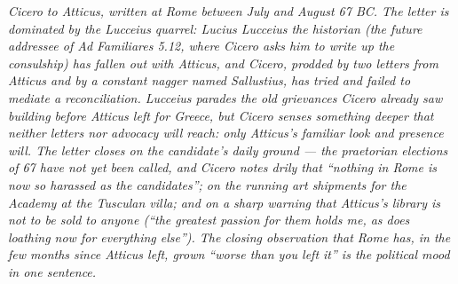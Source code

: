 
\textit{Cicero to Atticus, written at Rome between July and
August 67 BC. The letter is dominated by the Lucceius
quarrel: Lucius Lucceius the historian (the future
addressee of \textit{Ad Familiares} 5.12, where Cicero asks
him to write up the consulship) has fallen out with
Atticus, and Cicero, prodded by two letters from Atticus
and by a constant nagger named Sallustius, has tried and
failed to mediate a reconciliation. Lucceius parades the
old grievances Cicero already saw building before Atticus
left for Greece, but Cicero senses something deeper that
neither letters nor advocacy will reach: only Atticus's
familiar look and presence will. The letter closes on the
candidate's daily ground --- the praetorian elections of 67
have not yet been called, and Cicero notes drily that
``nothing in Rome is now so harassed as the candidates'';
on the running art shipments for the Academy at the
Tusculan villa; and on a sharp warning that Atticus's
library is not to be sold to anyone (``the greatest passion
for them holds me, as does loathing now for everything
else''). The closing observation that Rome has, in the few
months since Atticus left, grown ``worse than you left it''
is the political mood in one sentence.}
